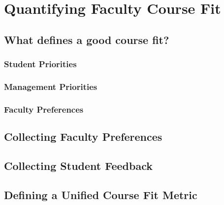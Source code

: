 
\chapter{Quantifying Faculty Course Fit}

\section{What defines a good course fit?}

\subsection{Student Priorities}

\subsection{Management Priorities}

\subsection{Faculty Preferences}

\section{Collecting Faculty Preferences}

\section{Collecting Student Feedback}

\section{Defining a Unified Course Fit Metric}
